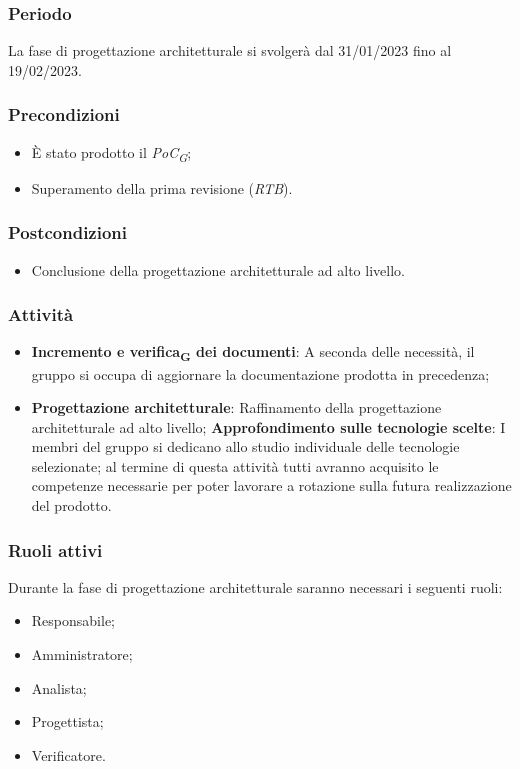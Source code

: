 \subsubsection{Periodo}
La fase di progettazione architetturale si svolgerà dal 31/01/2023 fino al 19/02/2023.

\subsubsection{Precondizioni}\:
\begin{itemize}
    \item È stato prodotto il \textit{PoC\textsubscript{G}};
    \item Superamento della prima revisione (\textit{RTB}).
\end{itemize}

\subsubsection{Postcondizioni}\:
\begin{itemize}
    \item Conclusione della progettazione architetturale ad alto livello.
\end{itemize}

\subsubsection{Attività}\:
\begin{itemize}
    \item \textbf{Incremento e verifica\textsubscript{G} dei documenti}: A seconda delle necessità, il gruppo si occupa di aggiornare la documentazione prodotta in precedenza;
    \item \textbf{Progettazione architetturale}: Raffinamento della progettazione architetturale ad alto livello;
        \subitem \textbf{Approfondimento sulle tecnologie scelte}: I membri del gruppo si dedicano allo studio individuale delle tecnologie selezionate; al termine di questa attività tutti avranno acquisito le competenze necessarie per poter lavorare a rotazione sulla futura realizzazione del prodotto.
\end{itemize}

\subsubsection{Ruoli attivi}
Durante la fase di progettazione architetturale saranno necessari i seguenti ruoli:
\begin{itemize}
	\item Responsabile;
    \item Amministratore;
    \item Analista;
    \item Progettista;
    \item Verificatore.
\end{itemize}

